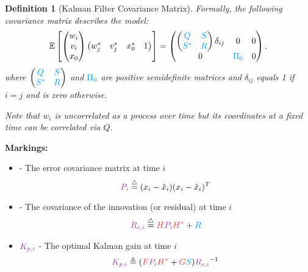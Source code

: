 \documentclass[a4 paper]{article}
\numberwithin{equation}{section}
\theoremstyle{boldStyle}
\theoremstyle{boldBlueStyle}
\theoremstyle{boldPurpleStyle}
\theoremstyle{boldRedStyle}
\newtheorem{definition}{Definition}[section]
\theoremstyle{boldGreenStyle}
\begin{document}
\begin{definition}[Kalman Filter Covariance Matrix] 
  Formally, the following covariance matrix describes the model:
  \begin{equation}
      \mathbb{E} \left[
      \begin{pmatrix}
          w_i \\
          v_i \\
          x_0
      \end{pmatrix}
      \begin{pmatrix}
          w_j^* & v_j^* & x_0^* & 1
      \end{pmatrix}
      \right] = 
      \begin{pmatrix}
          \begin{pmatrix}
            \tblu{Q} & \tblu{S} \\
            \tblu{S^*} & \tblu{R}
          \end{pmatrix} \delta_{ij} & 0 & 0 \\
          0 & \tblu{\Pi_0} & 0
      \end{pmatrix},
      \label{eq:covariance_matrix}
  \end{equation}
  where \(
    \begin{pmatrix}
      \tblu{Q} & \tblu{S} \\
      \tblu{S^*} & \tblu{R}
    \end{pmatrix}
  \) and \(\tblu{\Pi_0}\) are positive semidefinite matrices and \(\delta_{ij}\) equals 1 if \(i = j\) and is zero otherwise.
  
  Note that \(w_i\) is uncorrelated as a process over time but its coordinates at a fixed time can be correlated via \(Q\).
\end{definition}

\textbf{Markings:}
\begin{itemize}
    \item {} - The error covariance matrix at time \( i \)
    \begin{equation}
        \tpur{P_i} \eqdef (x_i - \hat{x}_i)(x_i - \hat{x}_i)^T
    \end{equation}

    \item {} - The covariance of the innovation (or residual) at time \( i \)
    \begin{equation}
        \tpur{R_{e,i}} \eqdef \tred{H} \tpur{P_i} \tred{H^*} + \tblu{R}  
    \end{equation}

    \item \(\tpur{K_{p,i}}\) - The optimal Kalman gain at time \( i \)
    \begin{equation}
        \tpur{K_{p,i}} \triangleq (\tred{F} \tpur{P_i} \tred{H^*} + \tred{G}\tblu{S}) \tpur{R_{e,i}}^{-1}
    \end{equation}

\end{itemize}
\end{document}
